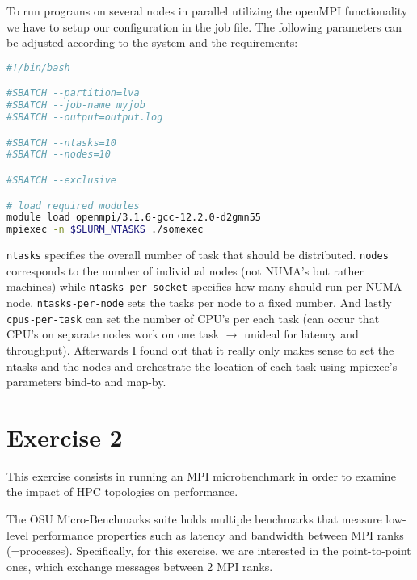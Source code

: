 \documentclass[UTF-8]{article}
\begin{document}
\begin{enumerate}
To run programs on several nodes in parallel utilizing the openMPI functionality we have to setup our configuration in the job file. The following parameters can be adjusted according to the system and the requirements:
\begin{lstlisting}[language=bash]
#!/bin/bash

#SBATCH --partition=lva
#SBATCH --job-name myjob
#SBATCH --output=output.log

#SBATCH --ntasks=10
#SBATCH --nodes=10

#SBATCH --exclusive

# load required modules
module load openmpi/3.1.6-gcc-12.2.0-d2gmn55 
mpiexec -n $SLURM_NTASKS ./somexec
\end{lstlisting}

\verb|ntasks| specifies the overall number of task that should be distributed. \verb|nodes| corresponds to the number of individual nodes (not NUMA's but rather machines) while \verb|ntasks-per-socket| specifies how many should run per NUMA node. \verb|ntasks-per-node| sets the tasks per node to a fixed number. And lastly \verb|cpus-per-task| can set the number of CPU's per each task (can occur that CPU's on separate nodes work on one task $\rightarrow$ unideal for latency and throughput). Afterwards I found out that it really only makes sense to set the ntasks and the nodes and orchestrate the location of each task using mpiexec's parameters bind-to and map-by.


	\end{enumerate}
	
    \section*{Exercise 2}
    This exercise consists in running an MPI microbenchmark in order to examine the impact of HPC topologies on performance.
    
    The OSU Micro-Benchmarks suite holds multiple benchmarks that measure low-level performance properties such as latency and bandwidth between MPI ranks (=processes). Specifically, for this exercise, we are interested in the point-to-point ones, which exchange messages between 2 MPI ranks.
    
\end{document}
